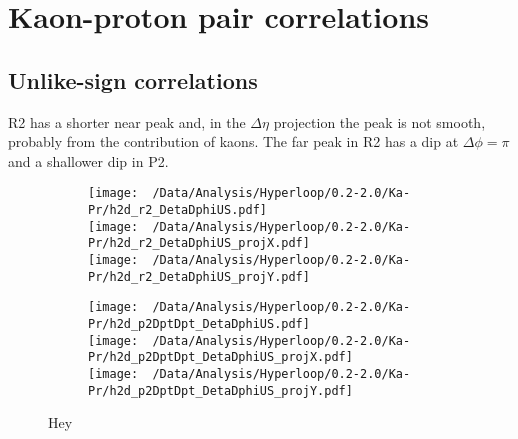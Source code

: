 \documentclass[12pt,a4paper,twoside]{report}
\begin{document}
\section{Kaon-proton pair correlations}
\subsection{Unlike-sign correlations}
R2 has a shorter near peak and, in the $\Delta\eta$ projection the peak is not smooth, probably from the contribution of kaons. The far peak in R2 has a dip at $\Delta\phi=\pi$ and a shallower dip in P2.
\begin{figure}[H]
	\begin{subfigure}{0.49\linewidth}
		\texttt{[image: ~/Data/Analysis/Hyperloop/0.2-2.0/Ka-Pr/h2d\_r2\_DetaDphiUS.pdf]}\\
		\texttt{[image: ~/Data/Analysis/Hyperloop/0.2-2.0/Ka-Pr/h2d\_r2\_DetaDphiUS\_projX.pdf]}\\
		\texttt{[image: ~/Data/Analysis/Hyperloop/0.2-2.0/Ka-Pr/h2d\_r2\_DetaDphiUS\_projY.pdf]}\\
	\end{subfigure}
	\begin{subfigure}{0.49\linewidth}
		\texttt{[image: ~/Data/Analysis/Hyperloop/0.2-2.0/Ka-Pr/h2d\_p2DptDpt\_DetaDphiUS.pdf]}\\
		\texttt{[image: ~/Data/Analysis/Hyperloop/0.2-2.0/Ka-Pr/h2d\_p2DptDpt\_DetaDphiUS\_projX.pdf]}\\
		\texttt{[image: ~/Data/Analysis/Hyperloop/0.2-2.0/Ka-Pr/h2d\_p2DptDpt\_DetaDphiUS\_projY.pdf]}\\
	\end{subfigure}
	\caption{Hey}
\end{figure}
\end{document}
